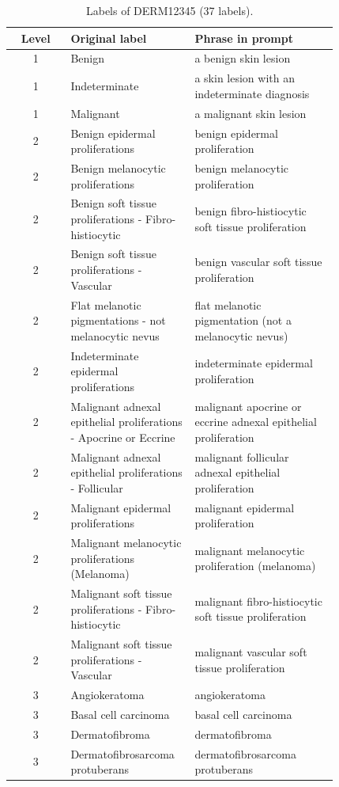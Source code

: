 \begin{table}[htbp]
\centering
\small
\caption{Labels of DERM12345 (37 labels).}\label{tab:labels_DERM12345}
\begin{tabular}{cp{0.38\linewidth}p{0.44\linewidth}}
\toprule
Level & Original label & Phrase in prompt \\
\midrule
1 & Benign & a benign skin lesion \\
1 & Indeterminate & a skin lesion with an indeterminate diagnosis \\
1 & Malignant & a malignant skin lesion \\
2 & Benign epidermal proliferations & benign epidermal proliferation \\
2 & Benign melanocytic proliferations & benign melanocytic proliferation \\
2 & Benign soft tissue proliferations - Fibro-histiocytic & benign fibro-histiocytic soft tissue proliferation \\
2 & Benign soft tissue proliferations - Vascular & benign vascular soft tissue proliferation \\
2 & Flat melanotic pigmentations - not melanocytic nevus & flat melanotic pigmentation (not a melanocytic nevus) \\
2 & Indeterminate epidermal proliferations & indeterminate epidermal proliferation \\
2 & Malignant adnexal epithelial proliferations - Apocrine or Eccrine & malignant apocrine or eccrine adnexal epithelial proliferation \\
2 & Malignant adnexal epithelial proliferations - Follicular & malignant follicular adnexal epithelial proliferation \\
2 & Malignant epidermal proliferations & malignant epidermal proliferation \\
2 & Malignant melanocytic proliferations (Melanoma) & malignant melanocytic proliferation (melanoma) \\
2 & Malignant soft tissue proliferations - Fibro-histiocytic & malignant fibro-histiocytic soft tissue proliferation \\
2 & Malignant soft tissue proliferations - Vascular & malignant vascular soft tissue proliferation \\
3 & Angiokeratoma & angiokeratoma \\
3 & Basal cell carcinoma & basal cell carcinoma \\
3 & Dermatofibroma & dermatofibroma \\
3 & Dermatofibrosarcoma protuberans & dermatofibrosarcoma protuberans \\

\end{tabular}
\end{table}
